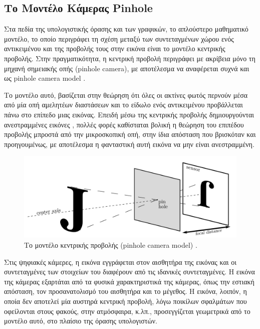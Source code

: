 \subsection{Το Μοντέλο Κάμερας Pinhole}


Στα πεδία της υπολογιστικής όρασης και των γραφικών, το απλούστερο μαθηματικό μοντέλο, το οποίο περιγράφει τη σχέση μεταξύ των συντεταγμένων χώρου ενός αντικειμένου και της προβολής τους στην εικόνα είναι το μοντέλο κεντρικής προβολής. Στην πραγματικότητα, η κεντρική προβολή περιγράφει με ακρίβεια μόνο τη μηχανή σημειακής οπής (pinhole camera), με αποτέλεσμα να αναφέρεται συχνά και ως pinhole camera model \cite{hartley2003multiple} .


Το μοντέλο αυτό, βασίζεται στην θεώρηση ότι όλες οι ακτίνες φωτός περνούν μέσα από μία οπή αμελητέων διαστάσεων και το είδωλο ενός αντικειμένου προβάλλεται πάνω στο επίπεδο μιας εικόνας. Επειδή μέσω της κεντρικής προβολής δημιουργούνται ανεστραμμένες εικόνες \cite{fig:pinhole3}, πολλές φορές καθίσταται βολική η θεώρηση του επιπέδου προβολής μπροστά από την μικροσκοπική οπή, στην ίδια απόσταση που βρισκόταν και προηγουμένως, με αποτέλεσμα η φανταστική αυτή εικόνα να μην είναι ανεστραμμένη. 



\begin{figure}[H]
    \centering
    \includegraphics[scale=0.5, angle=0]{Files/Figures/pinhole3.png}
    \caption[Το μοντέλο κεντρικής προβολής (pinhole camera model)]{ Το μοντέλο κεντρικής προβολής (pinhole camera model) \cite{pinhole} .}
    \label{fig:pinhole3}
\end{figure}

Στις ψηφιακές κάμερες, η εικόνα εγγράφεται στον αισθητήρα της εικόνας και οι συντεταγμένες των στοιχείων του διαφέρουν από τις ιδανικές συντεταγμένες. Η εικόνα της κάμερας εξαρτάται από τα φυσικά χαρακτηριστικά της κάμερας, όπως την εστιακή απόσταση, τον προσανατολισμό του αισθητήρα και το μέγεθος. H εικόνα, λοιπόν, η οποία δεν αποτελεί μία αυστηρά κεντρική προβολή, λόγω ποικίλων σφαλμάτων που οφείλονται στους φακούς, στην ατμόσφαιρα, κ.λπ., προσεγγίζεται γεωμετρικά από το μοντέλο αυτό, στο πλαίσιο της όρασης υπολογιστών.

